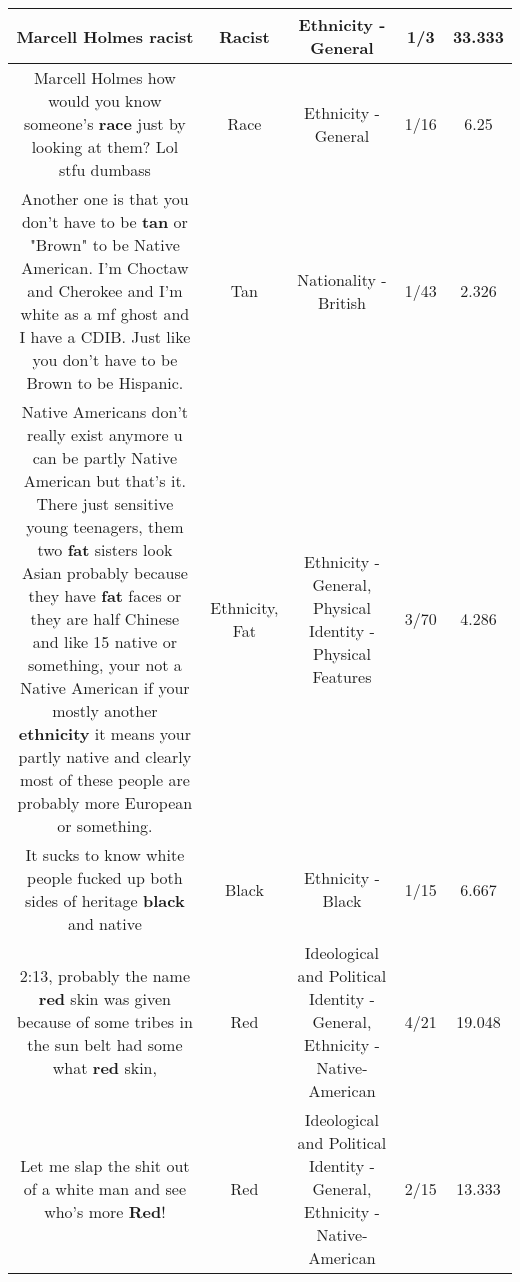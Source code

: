 \documentclass[11pt]{article}
\newlength\mylength
\begin{document}
\begin{center}
\begin{longtable}{|C{.65\mylength}|C{.30\mylength}|C{.12\mylength}|C{.12\mylength}|C{.12\mylength}|}
  \small Marcell Holmes racist\normalsize   & Racist & Ethnicity - General & 1/3 & 33.333 \\  \hline
  \small Marcell Holmes how would you know someone's \textbf{race} just by looking at them? Lol stfu dumbass\normalsize   & Race & Ethnicity - General & 1/16 & 6.25 \\  \hline
  \small Another one is that you don't have to be \textbf{tan} or "Brown" to be Native American. I'm Choctaw and Cherokee and I'm white as a mf ghost and I have a CDIB. Just like you don't have to be Brown to be Hispanic.\normalsize   & Tan & Nationality - British & 1/43 & 2.326 \\  \hline
  \small Native Americans don't really exist anymore u can be partly Native American but that's it. There just sensitive young teenagers, them two \textbf{fat} sisters look Asian probably because they have \textbf{fat} faces or they are half Chinese and like 15 native or something, your not a Native American if your mostly another \textbf{ethnicity} it means your partly native and clearly most of these people are probably more European or something.\normalsize   & Ethnicity, Fat & Ethnicity - General, Physical Identity - Physical Features & 3/70 & 4.286 \\  \hline
  \small It sucks to know white people fucked up both sides of heritage \textbf{black} and native\normalsize   & Black & Ethnicity - Black & 1/15 & 6.667 \\  \hline
  \small 2:13, probably the name \textbf{r\textbf{ed}} skin was given because of some tribes in the sun belt had some what \textbf{r\textbf{ed}} skin,\normalsize   & Red &  Ideological and Political Identity - General, Ethnicity - Native-American & 4/21 & 19.048 \\  \hline
  \small Let me slap the shit out of a white man and see who's more \textbf{R\textbf{ed}}!\normalsize   & Red &  Ideological and Political Identity - General, Ethnicity - Native-American & 2/15 & 13.333 \\  \hline

\end{longtable}
\end{center}
\end{document}
